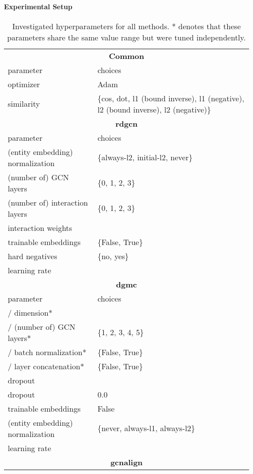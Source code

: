 \documentclass[runningheads]{llncs}
\newcommand{\tablesize}[0]{
\scriptsize
}
\begin{document}
\paragraph{Experimental Setup}
\begin{table}[t]
\centering
\caption{
Investigated hyperparameters for all methods. * denotes that these parameters share the same value range but were tuned independently.
}
\label{tab:hparam}
\tablesize{}
\begin{tabular*}{\textwidth}{lp{}}
    \toprule
    \multicolumn{2}{c}{\textbf{Common}} \\
    parameter & choices \\
    \midrule
    optimizer & Adam \\
    similarity & \{cos, dot, l1 (bound inverse), l1 (negative), l2 (bound inverse), l2 (negative)\} \\
    \toprule
    \multicolumn{2}{c}{\textbf{\acrshort{rdgcn}}} \\
    parameter & choices \\
    \midrule
    (entity embedding) normalization & \{always-l2, initial-l2, never\} \\
    (number of) GCN layers & \{0, 1, 2, 3\} \\
    (number of) interaction layers & \{0, 1, 2, 3\} \\
    interaction weights &  \\
    trainable embeddings & \{False, True\} \\
hard negatives & \{no, yes\} \\
    learning rate & \\
    \midrule
    \multicolumn{2}{c}{\textbf{\acrshort{dgmc}}} \\
    parameter & choices \\
    \midrule
     /  dimension* &  \\
     /   (number of) GCN layers* & \{1, 2, 3, 4, 5\} \\
     /   batch normalization* & \{False, True\} \\
      /  layer concatenation* & \{False, True\} \\
     dropout &  \\
     dropout & 0.0 \\
    trainable embeddings & False \\
    (entity embedding) normalization & \{never, always-l1, always-l2\} \\
    learning rate &  \\
    \midrule
    \multicolumn{2}{c}{\textbf{\acrshort{gcnalign}}} \\

\end{tabular*}
\end{table}
\end{document}
